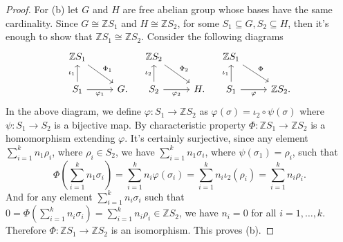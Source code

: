 \documentclass[a4paper]{article}
\theoremstyle{remark}
\newcommand{\Z}{\mathbb{Z}} %
\newcommand{\subhim}{\subseteq} %
\begin{document}
\begin{proof}
	For (b) let $G$ and $H$ are free abelian group whose bases have the same cardinality. Since $G \cong \Z S_1$ and $H \cong \Z S_2$, for some $S_1 \subhim G, S_2 \subhim H$, then it's enough to  show that $\Z S_1 \cong \Z S_2$. Consider the following diagrams
	\[
	\begin{tikzcd}
	\Z S_1 \arrow[dr,"\Phi_1"] & \\
	S_1 \arrow[u,"\iota_1"] \arrow[r,"\varphi_1",swap] & G.
	\end{tikzcd}
	\quad
	\begin{tikzcd}
	\Z S_2 \arrow[dr,"\Phi_2"] & \\
	S_2 \arrow[u,"\iota_2"] \arrow[r,"\varphi_2",swap] & H.
	\end{tikzcd}
    \quad
   \begin{tikzcd}
   \Z S_1 \arrow[dr,"\Phi"] & \\
   S_1 \arrow[u,"\iota_1"] \arrow[r,"\varphi",swap] & \Z S_2.
   \end{tikzcd}
	\]
   In the above diagram, we define $\varphi : S_1 \to \Z S_2$ as $\varphi(\sigma)=\iota_2 \circ \psi (\sigma)$ where $\psi : S_1 \to S_2$ is a bijective map. By characteristic property $\Phi : \Z S_1 \to \Z S_2$ is a homomorphism extending $\varphi$. It's certainly surjective, since any element $\sum_{i=1}^{k}n_1 \rho_i$, where $\rho_i \in S_2$, we have $\sum_{i=1}^{k}n_1 \sigma_i$, where $\psi(\sigma_1) = \rho_i$, such that
   $$
   \Phi (\sum_{i=1}^{k}n_1 \sigma_i) = \sum_{i=1}^{k} n_i \varphi(\sigma_i) = \sum_{i=1}^{k} n_i \iota_2(\rho_i) = \sum_{i=1}^{k} n_i \rho_i. 
   $$ 
   And for any element $\sum_{i=1}^{k} n_i \sigma_i$ such that $0=\Phi(\sum_{i=1}^{k} n_i \sigma_i)=\sum_{i=1}^{k} n_i \rho_i \in \Z S_2$, we have $n_i=0$ for all $i=1,\dots, k$. Therefore $\Phi : \Z S_1 \to \Z S_2$ is an isomorphism. This proves (b). 
\end{proof}
\end{document}
